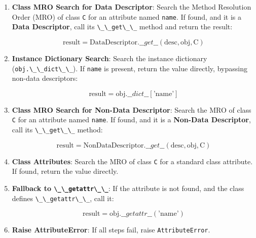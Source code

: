 \begin{enumerate}
\def\labelenumi{\arabic{enumi}.}
\item
  \textbf{Class MRO Search for Data Descriptor}: Search the Method
  Resolution Order (MRO) of class \passthrough{\lstinline!C!} for an
  attribute named \passthrough{\lstinline!name!}. If found, and it is a
  \textbf{Data Descriptor}, call its
  \passthrough{\lstinline!\_\_get\_\_!} method and return the result:

  \[\text{result} = \text{DataDescriptor}.\_\_get\_\_(\text{desc}, \text{obj}, \text{C})\]
\item
  \textbf{Instance Dictionary Search}: Search the instance dictionary
  (\passthrough{\lstinline!obj.\_\_dict\_\_!}). If
  \passthrough{\lstinline!name!} is present, return the value directly,
  bypassing non-data descriptors:

  \[\text{result} = \text{obj}.\_\_dict\_\_[\text{'name'}]\]
\item
  \textbf{Class MRO Search for Non-Data Descriptor}: Search the MRO of
  class \passthrough{\lstinline!C!} for an attribute named
  \passthrough{\lstinline!name!}. If found, and it is a \textbf{Non-Data
  Descriptor}, call its \passthrough{\lstinline!\_\_get\_\_!} method:

  \[\text{result} = \text{NonDataDescriptor}.\_\_get\_\_(\text{desc}, \text{obj}, \text{C})\]
\item
  \textbf{Class Attributes}: Search the MRO of class
  \passthrough{\lstinline!C!} for a standard class attribute. If found,
  return the value directly.
\item
  \textbf{Fallback to \passthrough{\lstinline!\_\_getattr\_\_!}}: If the
  attribute is not found, and the class defines
  \passthrough{\lstinline!\_\_getattr\_\_!}, call it:

  \[\text{result} = \text{obj}.\_\_getattr\_\_(\text{'name'})\]
\item
  \textbf{Raise AttributeError}: If all steps fail, raise
  \passthrough{\lstinline!AttributeError!}.
\end{enumerate}

